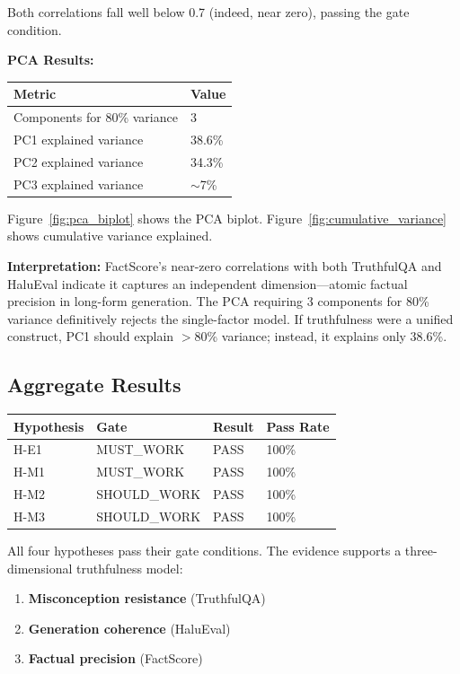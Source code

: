 Both correlations fall well below 0.7 (indeed, near zero), passing the gate condition.

\textbf{PCA Results:}

\begin{table}[h]
\centering
\begin{tabular}{@{}ll@{}}
\toprule
\textbf{Metric} & \textbf{Value} \\
\midrule
Components for 80\% variance & 3 \\
PC1 explained variance & 38.6\% \\
PC2 explained variance & 34.3\% \\
PC3 explained variance & $\sim$7\% \\
\bottomrule
\end{tabular}
\end{table}

Figure~\ref{fig:pca_biplot} shows the PCA biplot. Figure~\ref{fig:cumulative_variance} shows cumulative variance explained.

\textbf{Interpretation:} FactScore's near-zero correlations with both TruthfulQA and HaluEval indicate it captures an independent dimension---atomic factual precision in long-form generation. The PCA requiring 3 components for 80\% variance definitively rejects the single-factor model. If truthfulness were a unified construct, PC1 should explain $>$80\% variance; instead, it explains only 38.6\%.

\subsection{Aggregate Results}

\begin{table}[h]
\centering
\begin{tabular}{@{}llll@{}}
\toprule
\textbf{Hypothesis} & \textbf{Gate} & \textbf{Result} & \textbf{Pass Rate} \\
\midrule
H-E1 & MUST\_WORK & PASS & 100\% \\
H-M1 & MUST\_WORK & PASS & 100\% \\
H-M2 & SHOULD\_WORK & PASS & 100\% \\
H-M3 & SHOULD\_WORK & PASS & 100\% \\
\bottomrule
\end{tabular}
\end{table}

All four hypotheses pass their gate conditions. The evidence supports a three-dimensional truthfulness model:
\begin{enumerate}
\item \textbf{Misconception resistance} (TruthfulQA)
\item \textbf{Generation coherence} (HaluEval)
\item \textbf{Factual precision} (FactScore)
\end{enumerate}
